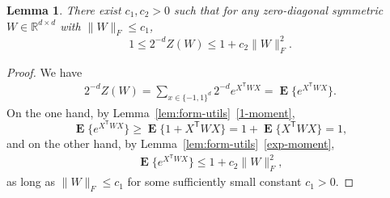\documentclass[letterpaper]{amsart}
\newcommand{\R}{\mathbb{R}}
\DeclareMathOperator{\E}{\mathbf{E}}
\numberwithin{thm}{section}
\newtheorem{lem}[thm]{Lemma}{\bfseries}{\itshape}
\newcommand{\lemlabel}[1]{\label{lem:#1}}
\newcommand{\lemref}[1]{Lemma~\ref{lem:#1}}
\theoremstyle{definition}
\theoremstyle{plain}
\newcommand{\transpose}{^{\mathsf{T}}}
\begin{document}
\begin{lem}\lemlabel{partition-function}
  There exist $c_1, c_2 > 0$ such that for any zero-diagonal symmetric
  $W \in \R^{d \times d}$ with $\|W\|_F \le c_1$,
  \[
    1 \le 2^{-d} Z(W) \le 1 + c_2 \|W\|_F^2 .
  \]
\end{lem}
\begin{proof}
  We have
  \begin{align*}
    2^{-d} Z(W) = \sum_{x \in \{-1, 1\}^d} 2^{-d} e^{X\transpose W X} = \E\{e^{X\transpose W X}\} .
  \end{align*}
  On the one hand, by \lemref{form-utils}~\ref{1-moment}, 
  \[
    \E\{e^{X\transpose W X }\} \ge \E\{1+X\transpose W X\} = 1 + \E\{X\transpose W X\} = 1 ,
  \]
  and on the other hand, by \lemref{form-utils}~\ref{exp-moment},
  \begin{align*}
    \E\{e^{X\transpose W X }\} \le 1 + c_2 \|W\|_F^2,
  \end{align*}
  as long as $\|W\|_F \leq c_1$ for some sufficiently small constant
  $c_1 > 0$.
\end{proof}
\end{document}
